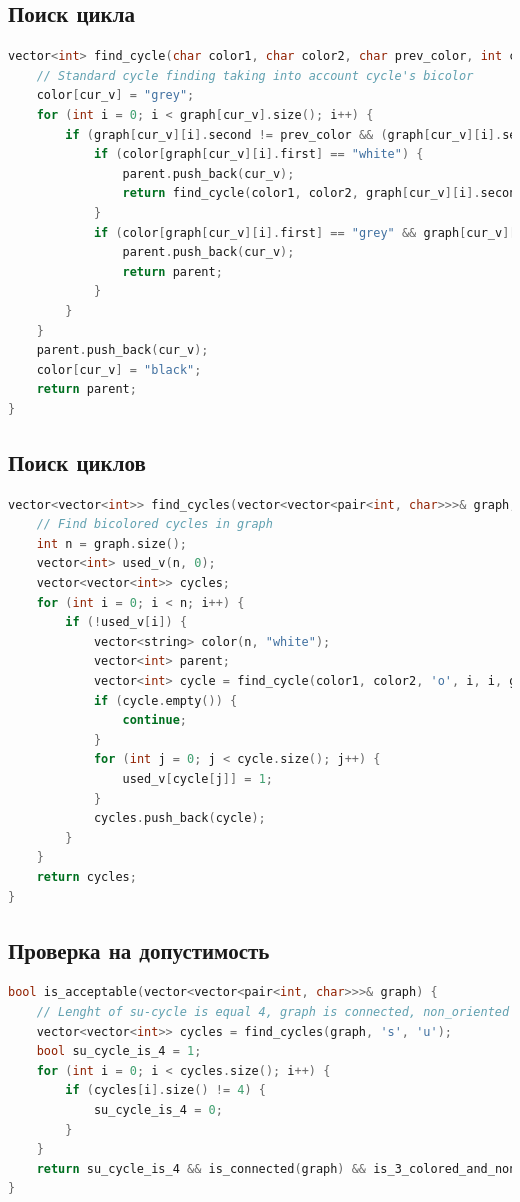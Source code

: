 \subsection{Поиск цикла}
\begin{lstlisting}[language=C++]
vector<int> find_cycle(char color1, char color2, char prev_color, int cur_v, int prev_v, vector<vector<pair<int, char>>>& graph, vector<string>& color, vector<int>& parent) {
	// Standard cycle finding taking into account cycle's bicolor
	color[cur_v] = "grey";
	for (int i = 0; i < graph[cur_v].size(); i++) {
		if (graph[cur_v][i].second != prev_color && (graph[cur_v][i].second == color1 || graph[cur_v][i].second == color2)) {
			if (color[graph[cur_v][i].first] == "white") {
				parent.push_back(cur_v);
				return find_cycle(color1, color2, graph[cur_v][i].second, graph[cur_v][i].first, cur_v, graph, color, parent);
			}
			if (color[graph[cur_v][i].first] == "grey" && graph[cur_v][i].first != prev_v && cur_v != prev_v) {
				parent.push_back(cur_v);
				return parent;
			}
		}
	}
	parent.push_back(cur_v);
	color[cur_v] = "black";
	return parent;
}
\end{lstlisting}
\subsection{Поиск циклов}
\begin{lstlisting}[language=C++]
vector<vector<int>> find_cycles(vector<vector<pair<int, char>>>& graph, char color1, char color2) {
	// Find bicolored cycles in graph
	int n = graph.size();
	vector<int> used_v(n, 0);
	vector<vector<int>> cycles;
	for (int i = 0; i < n; i++) {
		if (!used_v[i]) {
			vector<string> color(n, "white");
			vector<int> parent;
			vector<int> cycle = find_cycle(color1, color2, 'o', i, i, graph, color, parent);
			if (cycle.empty()) {
				continue;
			}
			for (int j = 0; j < cycle.size(); j++) {
				used_v[cycle[j]] = 1;
			}
			cycles.push_back(cycle);
		}
	}
	return cycles;
}
\end{lstlisting}
\subsection{Проверка на допустимость}
\begin{lstlisting}[language=C++]
bool is_acceptable(vector<vector<pair<int, char>>>& graph) {
	// Lenght of su-cycle is equal 4, graph is connected, non_oriented and tricolored
	vector<vector<int>> cycles = find_cycles(graph, 's', 'u');
	bool su_cycle_is_4 = 1;
	for (int i = 0; i < cycles.size(); i++) {
		if (cycles[i].size() != 4) {
			su_cycle_is_4 = 0;
		}
	}
	return su_cycle_is_4 && is_connected(graph) && is_3_colored_and_non_oriented(graph);
}
\end{lstlisting}
